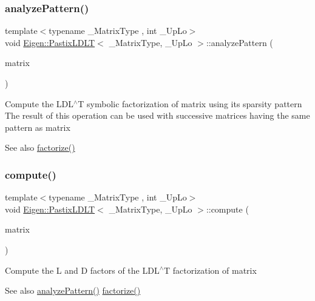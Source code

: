 \subsubsection{\texorpdfstring{analyzePattern()}{analyzePattern()}}
{\footnotesize\ttfamily template$<$typename \+\_\+\+Matrix\+Type , int \+\_\+\+Up\+Lo$>$ \\
void \mbox{\hyperlink{class_eigen_1_1_pastix_l_d_l_t}{Eigen\+::\+Pastix\+L\+D\+LT}}$<$ \+\_\+\+Matrix\+Type, \+\_\+\+Up\+Lo $>$\+::analyze\+Pattern (\begin{DoxyParamCaption}\item[{const Matrix\+Type \&}]{matrix }\end{DoxyParamCaption})\hspace{0.3cm}{\ttfamily [inline]}}

Compute the L\+D\+L$^\wedge$T symbolic factorization of {\ttfamily matrix} using its sparsity pattern The result of this operation can be used with successive matrices having the same pattern as {\ttfamily matrix} \begin{DoxySeeAlso}{See also}
\mbox{\hyperlink{class_eigen_1_1_pastix_l_d_l_t_a182b0ee676a131413363cc73bc309ef7}{factorize()}} 
\end{DoxySeeAlso}
\mbox{\label{class_eigen_1_1_pastix_l_d_l_t_abf3135c2dc17d9df26fef80e6456a691}} 
\subsubsection{\texorpdfstring{compute()}{compute()}}
{\footnotesize\ttfamily template$<$typename \+\_\+\+Matrix\+Type , int \+\_\+\+Up\+Lo$>$ \\
void \mbox{\hyperlink{class_eigen_1_1_pastix_l_d_l_t}{Eigen\+::\+Pastix\+L\+D\+LT}}$<$ \+\_\+\+Matrix\+Type, \+\_\+\+Up\+Lo $>$\+::compute (\begin{DoxyParamCaption}\item[{const Matrix\+Type \&}]{matrix }\end{DoxyParamCaption})\hspace{0.3cm}{\ttfamily [inline]}}

Compute the L and D factors of the L\+D\+L$^\wedge$T factorization of {\ttfamily matrix} \begin{DoxySeeAlso}{See also}
\mbox{\hyperlink{class_eigen_1_1_pastix_l_d_l_t_a01947862303ca404b9ce5033751a221b}{analyze\+Pattern()}} \mbox{\hyperlink{class_eigen_1_1_pastix_l_d_l_t_a182b0ee676a131413363cc73bc309ef7}{factorize()}} 
\end{DoxySeeAlso}
\mbox{\label{class_eigen_1_1_pastix_l_d_l_t_a182b0ee676a131413363cc73bc309ef7}} 
